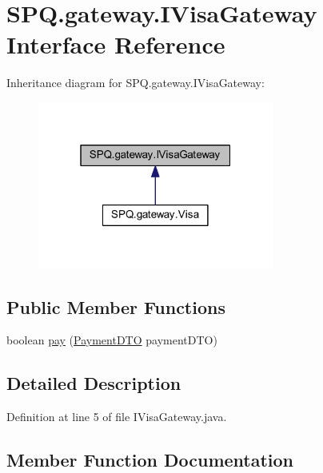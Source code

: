 \hypertarget{interface_s_p_q_1_1gateway_1_1_i_visa_gateway}{}\section{S\+P\+Q.\+gateway.\+I\+Visa\+Gateway Interface Reference}
\label{interface_s_p_q_1_1gateway_1_1_i_visa_gateway}


Inheritance diagram for S\+P\+Q.\+gateway.\+I\+Visa\+Gateway\+:\nopagebreak
\begin{figure}[H]
\begin{center}
\leavevmode
\includegraphics[width=220pt]{interface_s_p_q_1_1gateway_1_1_i_visa_gateway__inherit__graph}
\end{center}
\end{figure}
\subsection*{Public Member Functions}
\begin{DoxyCompactItemize}
\item 
boolean \mbox{\hyperlink{interface_s_p_q_1_1gateway_1_1_i_visa_gateway_adb8feee5084ca3e28c61360719a24c7a}{pay}} (\mbox{\hyperlink{class_s_p_q_1_1dto_1_1_payment_d_t_o}{Payment\+D\+TO}} payment\+D\+TO)
\end{DoxyCompactItemize}


\subsection{Detailed Description}


Definition at line 5 of file I\+Visa\+Gateway.\+java.



\subsection{Member Function Documentation}
\mbox{\label{interface_s_p_q_1_1gateway_1_1_i_visa_gateway_adb8feee5084ca3e28c61360719a24c7a}} 
